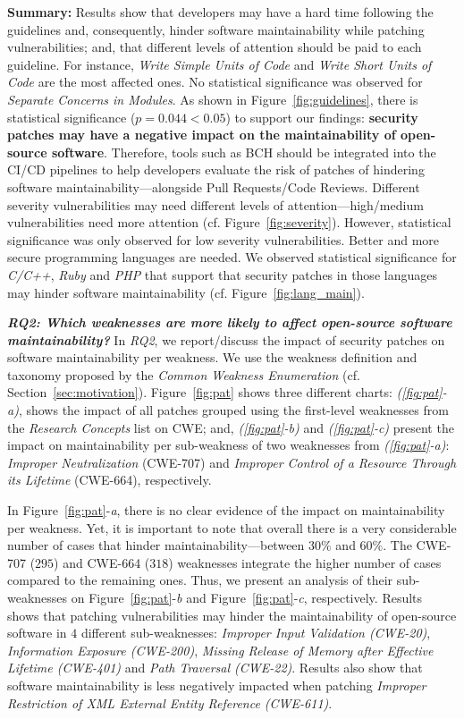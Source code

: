 \documentclass[smallextended]{svjour3}       %
\begin{document}
\textbf{Summary:} Results show that developers may have a
hard time following the guidelines and, consequently, hinder
software maintainability while patching vulnerabilities; and, that different levels of
attention should be paid to each guideline. For instance,
\emph{Write Simple Units of Code} and \emph{Write Short Units of Code}
are the most affected ones. No statistical significance was observed
for \emph{Separate Concerns in Modules}.
As shown in Figure~\ref{fig:guidelines}, there is statistical significance ($p=0.044 < 0.05$) to support our findings: \textbf{security patches
may have a negative impact on the maintainability of open-source software}. Therefore, tools such as BCH should be integrated into the CI/CD pipelines
to help developers evaluate the risk of patches of hindering software maintainability---alongside
Pull Requests/Code Reviews. Different severity
vulnerabilities may need different levels of attention---high/medium vulnerabilities need more attention (cf. Figure~\ref{fig:severity}). However, statistical significance was only observed for low severity vulnerabilities. Better and more secure programming languages are needed. We observed statistical significance for \emph{C/C++}, \emph{Ruby} and \emph{PHP} that support that security patches in those languages may hinder software maintainability (cf. Figure~\ref{fig:lang_main}).
%

\textit{\textbf{RQ2: Which weaknesses are more likely to
affect open-source software maintainability?}}
In \emph{RQ2}, we report/discuss the impact of security patches on
software maintainability per weakness. We use the weakness definition
and taxonomy proposed by the \emph{Common Weakness Enumeration} (cf. Section~\ref{sec:motivation}).
Figure~\ref{fig:pat} shows three different charts: \emph{(\ref{fig:pat}-a)}, shows
the impact of all patches grouped using the first-level weaknesses from
the \emph{Research Concepts} list on CWE; and, \emph{(\ref{fig:pat}-b)} and  
\emph{(\ref{fig:pat}-c)} present the impact on maintainability per sub-weakness of two 
weaknesses from \emph{(\ref{fig:pat}-a)}: \emph{Improper Neutralization} (CWE-707) and 
\emph{Improper Control of a Resource 
Through its Lifetime} (CWE-664), respectively.

In Figure~\ref{fig:pat}-\emph{a}, there is no clear evidence of the impact on 
maintainability per weakness. Yet, it is important to note that
overall there is a very considerable number of cases that hinder
maintainability---between $30\%$ and $60\%$.
The CWE-707 ($295$) and CWE-664 ($318$) 
weaknesses integrate the higher number of cases compared to the remaining 
ones. Thus, we present an analysis of their sub-weaknesses on 
Figure~\ref{fig:pat}-\emph{b} and Figure~\ref{fig:pat}-\emph{c}, respectively. 
Results shows that patching vulnerabilities may hinder 
the maintainability of open-source software in $4$ different sub-weaknesses: 
\emph{Improper Input Validation (CWE-20)}, \emph{Information Exposure 
(CWE-200)}, \emph{Missing Release of Memory after Effective 
Lifetime (CWE-401)} and \emph{Path Traversal (CWE-22)}. Results also show that 
software maintainability is less negatively impacted when patching 
\emph{Improper Restriction of XML External Entity Reference (CWE-611)}.  
\end{document}

